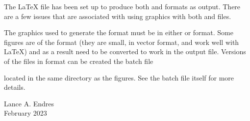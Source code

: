 The \LaTeX{} file has been set up to produce both  and  formats as output.  There are a few issues that are associated with using graphics with both  and  files.

The graphics used to generate the  format must be in either  or  format.  Some figures are of the  format (they are small, in vector format, and work well with \LaTeX) and as a result need to be converted to work in the  output file.  Versions of the  files in  format can be created the batch file
\begin{plainlist}
	\item {}
\end{plainlist}
located in the same directory as the figures.  See the batch file itself for more details.

\vspace{\baselineskip}%
\noindent Lance A. Endres \\February 2023%